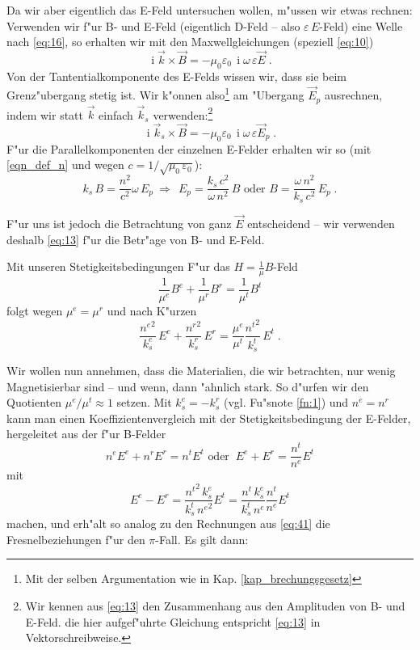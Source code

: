\documentclass[twoside,a4paper]{book}
\newcommand{\Folgt}{\ensuremath{~ \Rightarrow ~ ~ }}
\newcommand{\I}{\ensuremath{\operatorname{i}}}
\begin{document}
Da wir aber eigentlich das E-Feld untersuchen wollen, m"ussen wir
etwas rechnen: Verwenden wir f"ur B- und E-Feld
(eigentlich D-Feld -- also $\varepsilon\, E$-Feld) eine Welle nach
\eqref{eq:16}, so erhalten wir mit den Maxwellgleichungen (speziell
\eqref{eq:10})
\begin{equation}
   \label{eq:47}
   \I \vec k \times \vec B = - \mu_0\varepsilon_0 \, \I \omega \, \varepsilon \vec
   E \;.
\end{equation}
Von der Tantentialkomponente des E-Felds wissen wir, dass sie beim
Grenz"ubergang stetig ist. Wir k"onnen also\footnote{Mit der selben
  Argumentation wie in Kap. \ref{kap_brechungsgesetz}} am "Ubergang
$\vec E_p$ ausrechnen, indem wir statt $\vec k$ einfach $\vec k_s$
verwenden:\footnote{Wir kennen  aus \eqref{eq:13} den Zusammenhang aus den
Amplituden von B- und E-Feld. die hier aufgef"uhrte Gleichung
entspricht \eqref{eq:13} in Vektorschreibweise.}
\begin{equation*}
     \I \vec k_s \times \vec B = - \mu_0\varepsilon_0 \, \I \omega \, \varepsilon \vec
   E_p \;.
\end{equation*}
 F"ur die Parallelkomponenten der einzelnen E-Felder
erhalten wir so (mit \eqref{eqn_def_n} und wegen $c = 1/\sqrt{\mu_0\,
  \varepsilon_0}$):
\begin{equation*}
   k_s \, B =  \frac{n^2}{c^2} \omega \, E_p \Folgt
E_p = \frac{k_s  \, c^2}{\omega \, n^2} \, B  \text{ oder }
B = \frac{\omega \, n^2}{k_s  \, c^2} \, E_p \;.
\end{equation*}

F"ur uns ist jedoch die Betrachtung von ganz $\vec E$ entscheidend --
wir verwenden deshalb \eqref{eq:13} f"ur die Betr"age von B- und E-Feld.

Mit unseren Stetigkeitsbedingungen F"ur das $H=\frac{1}{\mu}B$-Feld
\begin{equation*}
   \frac{1}{\mu^e} B^e +    \frac{1}{\mu^r} B^r  =    \frac{1}{\mu^t} B^t 
\end{equation*}
folgt wegen $\mu^e = \mu^r$ und nach K"urzen
\begin{equation*}
   \frac{{n^e}^2}{k_s^e} \, E^e +    \frac{{n^r}^2}{k_s^r}\, E^r
   = \frac{\mu^e}{\mu^t} \frac{{n^t}^2}{k_s^t}\, E^t \;.
\end{equation*}

Wir wollen nun annehmen, dass die Materialien, die wir betrachten, nur
wenig Magnetisierbar sind -- und wenn, dann "ahnlich stark. So d"urfen
wir den Quotienten $\mu^e / \mu^t \approx 1$ setzen. Mit $k_s^e = -
k_s^r$ (vgl. Fu"snote \ref{fn:1}) und $n^e = n^r$ kann man einen
Koeffizientenvergleich mit der Stetigkeitsbedingung der E-Felder,
hergeleitet aus der f"ur B-Felder
\begin{equation*}
   n^e E^e +    n^r E^r =    n^t E^t \text{ oder }
~    E^e +    E^r =    \frac{n^t}{n^e} E^t
\end{equation*}
mit
\begin{equation*}
     E^e -    E^r = \frac{{n^t}^2 \, k_s^e}{k_s^t \,
         {n^e}^2} E^t = \frac{{n^t} \, k_s^e}{k_s^t \,
         {n^e}} \frac{n^t}{n^e} E^t
\end{equation*}
machen, und erh"alt so analog zu den Rechnungen aus \eqref{eq:41} die
Fresnelbeziehungen f"ur den $\pi$-Fall.  Es gilt dann:
\end{document}
